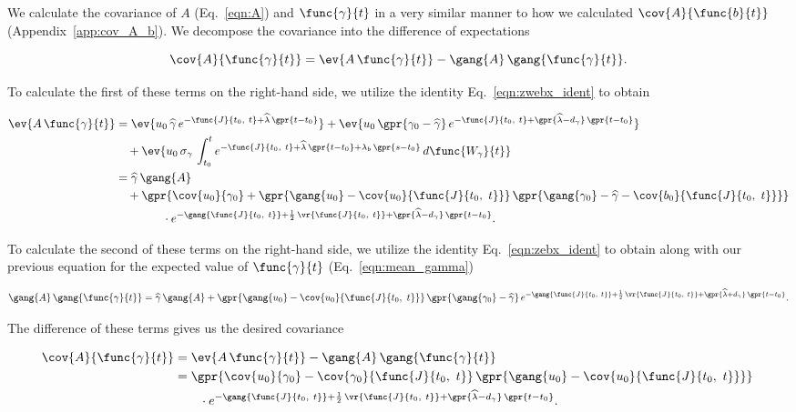 We calculate the covariance of $A$ (Eq.~\ref{eqn:A}) and $\func{\gamma}{t}$ in a very similar manner to how we calculated $\cov{A}{\func{b}{t}}$ (Appendix~\ref{app:cov_A_b}). We decompose the covariance into the difference of expectations

\begin{equation}
	\cov{A}{\func{\gamma}{t}} = \ev{A\,\func{\gamma}{t}} - \gang{A}\,\gang{\func{\gamma}{t}}.
\end{equation}

To calculate the first of these terms on the right-hand side, we utilize the identity Eq.~\ref{eqn:zwebx_ident} to obtain

\begin{align}
	\ev{A\,\func{\gamma}{t}} &= \ev{u_0\,\widehat{\gamma}\,e^{-\func{J}{t_0,\ t} + \widehat{\lambda}\,\gpr{t - t_0}}} + \ev{u_0\,\gpr{\gamma_0 - \widehat{\gamma}}\,e^{-\func{J}{t_0,\ t} + \gpr{\widehat{\lambda} - d_{\gamma}}\,\gpr{t - t_0}}} \nonumber \\
			&\quad + \ev{u_0\,\sigma_\gamma\,\int_{t_0}^{t} e^{-\func{J}{t_0,\ t} + \widehat{\lambda}\,\gpr{t - t_0} + \lambda_b\,\gpr{s - t_0}}\,d\func{W_{\gamma}}{t}} \nonumber \\
		&= \widehat{\gamma}\,\gang{A} \nonumber \\
			&\quad + \gpr{\cov{u_0}{\gamma_0} + \gpr{\gang{u_0} - \cov{u_0}{\func{J}{t_0,\ t}}}\,\gpr{\gang{\gamma_0} - \widehat{\gamma} - \cov{b_0}{\func{J}{t_0,\ t}}}} \nonumber \\
			&\qquad\qquad \cdot e^{-\gang{\func{J}{t_0,\ t}} + \frac{1}{2}\,\vr{\func{J}{t_0,\ t}} + \gpr{\widehat{\lambda} - d_\gamma}\,\gpr{t - t_0}}.
\end{align}

To calculate the second of these terms on the right-hand side, we utilize the identity Eq.~\ref{eqn:zebx_ident} to obtain along with our previous equation for the expected value of $\func{\gamma}{t}$ (Eq.~\ref{eqn:mean_gamma})

\begin{equation}
	\gang{A}\,\gang{\func{\gamma}{t}} = \widehat{\gamma}\,\gang{A} + \gpr{\gang{u_0} - \cov{u_0}{\func{J}{t_0,\ t}}}\,\gpr{\gang{\gamma_0} - \widehat{\gamma}}\,e^{-\gang{\func{J}{t_0,\ t}} + \frac{1}{2}\,\vr{\func{J}{t_0,\ t}} + \gpr{\widehat{\lambda} + d_{\gamma}}\,\gpr{t - t_0}}.
\end{equation}

The difference of these terms gives us the desired covariance

\begin{align}
	\cov{A}{\func{\gamma}{t}} &= \ev{A\,\func{\gamma}{t}} - \gang{A}\,\gang{\func{\gamma}{t}} \nonumber \\
		&= \gpr{\cov{u_0}{\gamma_0} - \cov{\gamma_0}{\func{J}{t_0,\ t}}\,\gpr{\gang{u_0} - \cov{u_0}{\func{J}{t_0,\ t}}}}\, \nonumber \\
			&\qquad \cdot e^{-\gang{\func{J}{t_0,\ t}} + \frac{1}{2}\,\vr{\func{J}{t_0,\ t}} + \gpr{\widehat{\lambda} - d_{\gamma}}\,\gpr{t - t_0}}. \label{eqn:cov_A_gamma}
\end{align}

